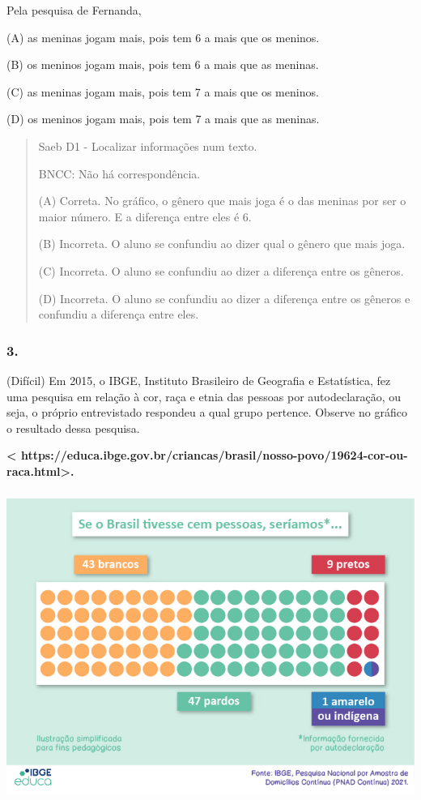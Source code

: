 Pela pesquisa de Fernanda,

(A) as meninas jogam mais, pois tem 6 a mais que os meninos.

(B) os meninos jogam mais, pois tem 6 a mais que as meninas.

(C) as meninas jogam mais, pois tem 7 a mais que os meninos.

(D) os meninos jogam mais, pois tem 7 a mais que as meninas.

\begin{quote}
Saeb D1 - Localizar informações num texto.

BNCC: Não há correspondência.

(A) Correta. No gráfico, o gênero que mais joga é o das meninas por ser
o maior número. E a diferença entre eles é 6.

(B) Incorreta. O aluno se confundiu ao dizer qual o gênero que mais
joga.

(C) Incorreta. O aluno se confundiu ao dizer a diferença entre os
gêneros.

(D) Incorreta. O aluno se confundiu ao dizer a diferença entre os
gêneros e confundiu a diferença entre eles.
\end{quote}

\subsubsection{3. }\label{section-70}

(Difícil) Em 2015, o IBGE, Instituto Brasileiro de Geografia e
Estatística, fez uma pesquisa em relação à cor, raça e etnia das pessoas
por autodeclaração, ou seja, o próprio entrevistado respondeu a qual
grupo pertence. Observe no gráfico o resultado dessa pesquisa.

\textbf{\textless{}
https://educa.ibge.gov.br/criancas/brasil/nosso-povo/19624-cor-ou-raca.html\textgreater{}.
}

\includegraphics[width=5.51042in,height=3.98702in]{media/image32.jpeg}


